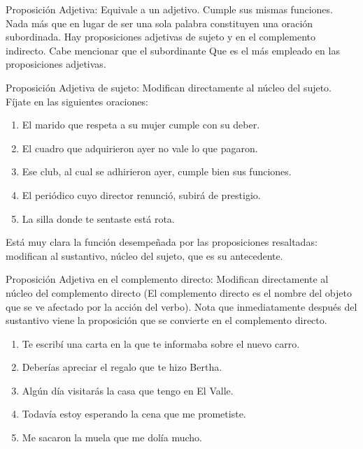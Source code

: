 \begin{lista}
\item Proposición Adjetiva: Equivale a un adjetivo. Cumple sus mismas
funciones. Nada más que en lugar de ser una sola palabra constituyen
una oración subordinada. Hay proposiciones adjetivas de sujeto y en
el complemento indirecto. Cabe mencionar que el subordinante \textquotedbl{}Que\textquotedbl{}
es el más empleado en las proposiciones adjetivas.

\item Proposición Adjetiva de sujeto: Modifican directamente al núcleo
del sujeto. Fíjate en las siguientes oraciones:

\begin{ejems}{}
\begin{enumerate}
\item El marido \textsf{que respeta a su mujer} cumple con su deber. 
\item El cuadro \textsf{que adquirieron ayer} no vale lo que pagaron. 
\item Ese club, \textsf{al cual se adhirieron ayer}, cumple bien sus funciones. 
\item El periódico \textsf{cuyo director renunció}, subirá de prestigio. 
\item La silla \textsf{donde te sentaste} está rota. 
\end{enumerate}
\end{ejems}

Está muy clara la función desempeñada por las proposiciones resaltadas:
modifican al sustantivo, núcleo del sujeto, que es su antecedente.

\item Proposición Adjetiva en el complemento directo: Modifican directamente
al núcleo del complemento directo (El complemento directo es el nombre
del objeto que se ve afectado por la acción del verbo). Nota que inmediatamente
después del sustantivo viene la proposición que se convierte en el
complemento directo.

\begin{ejems}{}
\begin{enumerate}
\item Te escribí una carta \textsf{en la que te informaba sobre el nuevo
carro}. 
\item Deberías apreciar el regalo q\textsf{ue te hizo Bertha}. 
\item Algún día visitarás la casa \textsf{que tengo en El Valle}. 
\item Todavía estoy esperando la cena \textsf{que me prometiste}. 
\item Me sacaron la muela \textsf{que me dolía mucho}.
\end{enumerate}
\end{ejems}


\end{lista}
